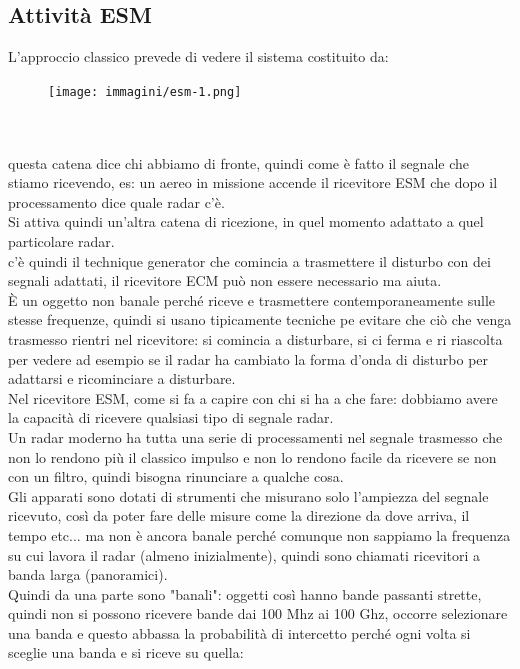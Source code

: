 \documentclass[oneside, 12pt]{extbook}
\begin{document}
\subsection{Attività ESM}
L'approccio classico prevede di vedere il sistema costituito da:\\
\begin{figure}[!h]
	\texttt{[image: immagini/esm-1.png]}
\end{figure}\\\\
questa catena dice chi abbiamo di fronte, quindi come è fatto il segnale che stiamo ricevendo, es: un aereo in missione accende il ricevitore ESM che dopo il processamento dice quale radar c'è.\\
Si attiva quindi un'altra catena di ricezione, in quel momento adattato a quel particolare radar.\\
c'è quindi il technique generator che comincia a trasmettere il disturbo con dei segnali adattati, il ricevitore ECM può non essere necessario ma aiuta.\\
È un oggetto non banale perché riceve e trasmettere contemporaneamente sulle stesse frequenze, quindi si usano tipicamente tecniche pe evitare che ciò che venga trasmesso rientri nel ricevitore: si comincia a disturbare, si ci ferma e ri riascolta per vedere ad esempio se il radar ha cambiato la forma d'onda di disturbo per adattarsi e ricominciare a disturbare.\\
Nel ricevitore ESM, come si fa a capire con chi si ha a che fare: dobbiamo avere la capacità di ricevere qualsiasi tipo di segnale radar.\\
Un radar moderno ha tutta una serie di processamenti nel segnale trasmesso che non lo rendono più il classico impulso e non lo rendono facile da ricevere se non con un filtro, quindi bisogna rinunciare a qualche cosa.\\
Gli apparati sono dotati di strumenti che misurano solo l'ampiezza del segnale ricevuto, così da poter fare delle misure come la direzione da dove arriva, il tempo etc... ma non è ancora banale perché comunque non sappiamo la frequenza su cui lavora il radar (almeno inizialmente), quindi sono chiamati ricevitori a banda larga (panoramici).\\
Quindi da una parte sono "banali": oggetti così hanno bande passanti strette, quindi non si possono ricevere bande dai 100 Mhz ai 100 Ghz, occorre selezionare una banda e questo abbassa la probabilità di intercetto perché ogni volta si sceglie una banda e si riceve su quella:\\
\end{document}
